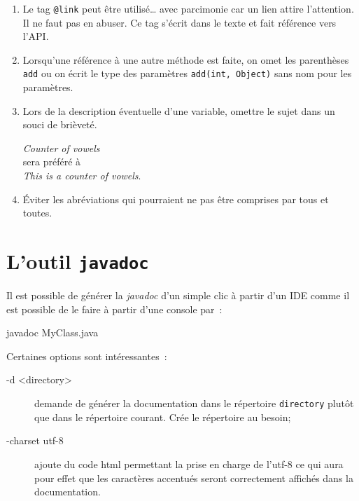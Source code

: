 \begin{enumerate}
	\item Le tag \texttt{@link} peut être utilisé… avec parcimonie car un lien
		attire l'attention. Il ne faut pas en abuser. Ce tag s'écrit dans le
		texte et fait référence vers l'API.

	\item Lorsqu'une référence à une autre méthode est faite, on omet les
		parenthèses \texttt{add} ou on écrit le type des paramètres
		\texttt{add(int, Object)} sans nom pour les paramètres. 

	\item Lors de la description éventuelle d'une variable, omettre le sujet
		dans un souci de brièveté. 

		\medskip
		\textit{Counter of vowels}\\
		sera préféré à\\
		\textit{This is a counter of vowels}.

	\item Éviter les abréviations qui pourraient ne pas être comprises par tous
		et toutes. 

\end{enumerate}







\section{L'outil \texttt{javadoc}}

Il est possible de générer la \textit{javadoc} d'un simple clic à partir d'un IDE comme il est possible de le faire à partir d'une console par~:

\begin{term}
	javadoc MyClass.java
\end{term}

Certaines options sont intéressantes~:

\begin{description}

	\item[-d <directory>] demande de générer la documentation dans le
		répertoire \texttt{directory} plutôt que dans le répertoire courant.
		Crée le répertoire au besoin;

	\item[-charset utf-8] ajoute du code html permettant la prise en charge de
		l'utf-8 ce qui aura pour effet que les caractères accentués seront
		correctement affichés dans la documentation. 

\end{description}

